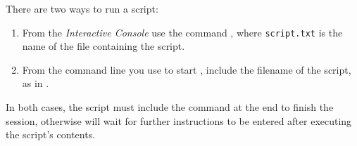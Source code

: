There are two ways to run a script:
\begin{enumerate}
    \item From the \emph{Interactive Console} use the command , where \texttt{script.txt} is the name of the file containing the script.

    \item From the command line you use to start \poy, include the filename of
        the script, as in .
\end{enumerate}

In both cases, the script must include the command  at the
end to finish the session, otherwise \poy will wait for further instructions to
be entered after executing the script's contents.

